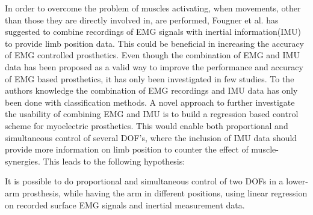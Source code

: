In order to overcome the problem of muscles activating, when movements, other than those they are directly involved in, are performed, Fougner et al. \cite{Fougner2011} has suggested to combine recordings of EMG signals with inertial information(IMU) to provide limb position data. This could be beneficial in increasing the accuracy of EMG controlled prosthetics. 
Even though the combination of EMG and IMU data has been proposed as a valid way to improve the performance and accuracy of EMG based prosthetics, it has only been investigated in few studies. \cite{Roy2010, Imtiaz2014, jiang2012}
To the authors knowledge the combination of EMG recordings and IMU data has only been done with classification methods. A novel approach to further investigate the usability of combining EMG and IMU is to build a regression based control scheme for myoelectric prosthetics. This would enable both proportional and simultaneous control of several DOF's, where the inclusion of IMU data should provide more information on limb position to counter the effect of muscle-synergies.
This leads to the following hypothesis:
\begin{center}
	 It is possible to do proportional and simultaneous control of two DOFs in a lower-arm prosthesis, while having the arm in different positions, using linear regression on recorded surface EMG signals and inertial measurement data.
\end{center}








